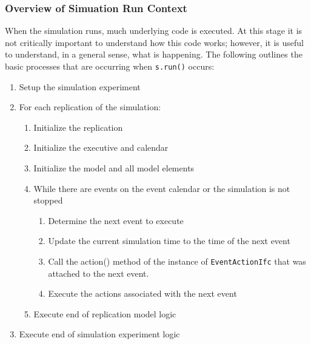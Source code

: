 \documentclass[
]{book}
\theoremstyle{definition}
\theoremstyle{definition}
\theoremstyle{definition}
\theoremstyle{definition}
\theoremstyle{remark}
\begin{document}
\hypertarget{overview-of-simuation-run-context}{%
\subsubsection{Overview of Simuation Run Context}\label{overview-of-simuation-run-context}}

When the simulation runs, much underlying code is executed. At this
stage it is not critically important to understand how this code works;
however, it is useful to understand, in a general sense, what is
happening. The following outlines the basic processes that are occurring
when \texttt{s.run()} occurs:

\begin{enumerate}
\def\labelenumi{\arabic{enumi}.}
\item
  Setup the simulation experiment
\item
  For each replication of the simulation:

  \begin{enumerate}
  \def\labelenumii{\alph{enumii}.}
  \item
    Initialize the replication
  \item
    Initialize the executive and calendar
  \item
    Initialize the model and all model elements
  \item
    While there are events on the event calendar or the simulation
    is not stopped

    \begin{enumerate}
    \def\labelenumiii{\roman{enumiii}.}
    \item
      Determine the next event to execute
    \item
      Update the current simulation time to the time of the next
      event
    \item
      Call the action() method of the instance of \texttt{EventActionIfc} that was attached to the next event.
    \item
      Execute the actions associated with the next event
    \end{enumerate}
  \item
    Execute end of replication model logic
  \end{enumerate}
\item
  Execute end of simulation experiment logic
\end{enumerate}
\end{document}
